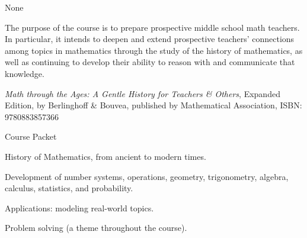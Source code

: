 \documentclass{osucourse}
\begin{document}
\CatalogDescription
\PrerequisitesAndExclusions

\begin{FollowupCourses}
None
\end{FollowupCourses}

\begin{Purpose}
The purpose of the course is to prepare prospective middle school math teachers. In particular, it intends to deepen and extend prospective teachers’ connections among topics in mathematics through the study of the history of mathematics, as well as continuing to develop their ability to reason with and communicate that knowledge.
\end{Purpose}

\begin{Text}
\emph{Math through the Ages: A Gentle History for Teachers \& Others}, Expanded Edition, by Berlinghoff \& Bouvea, published by Mathematical Association, ISBN: 9780883857366

Course Packet
\end{Text}

\begin{TopicsList}
\item History of Mathematics, from ancient to modern times.
\item Development of number systems, operations, geometry, trigonometry, algebra, calculus, statistics, and probability.
\item Applications: modeling real-world topics.
\item Problem solving (a theme throughout the course).
\end{TopicsList}
\end{document}
